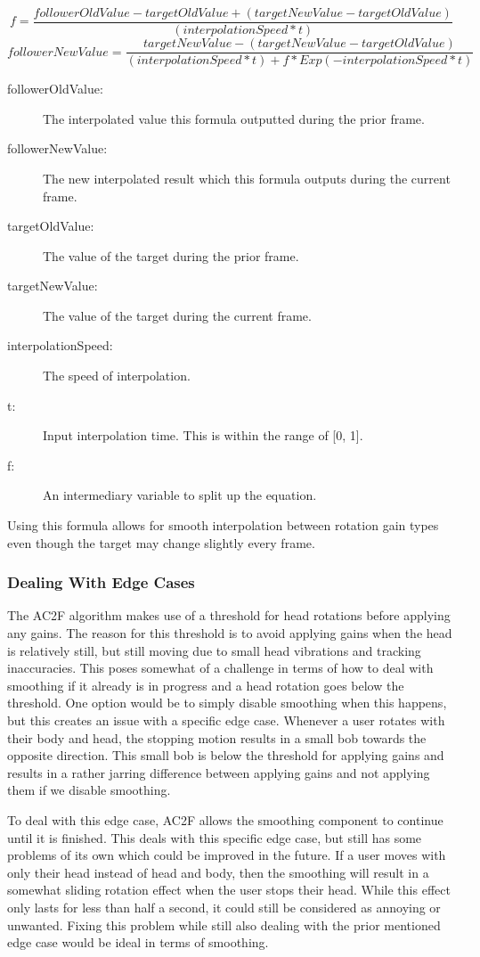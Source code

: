 $$
f = \frac{followerOldValue - targetOldValue + (targetNewValue - targetOldValue)}{(interpolationSpeed * t)}
$$
$$
followerNewValue = \frac{targetNewValue - (targetNewValue - targetOldValue)}{(interpolationSpeed * t) + f * Exp(-interpolationSpeed * t)}
$$
\begin{description}
    \item[followerOldValue:] The interpolated value this formula outputted during the prior frame.
    \item[followerNewValue:] The new interpolated result which this formula outputs during the current frame.
    \item[targetOldValue:] The value of the target during the prior frame. 
    \item[targetNewValue:] The value of the target during the current frame.
    \item[interpolationSpeed:] The speed of interpolation.
    \item[t:] Input interpolation time. This is within the range of [0, 1]. 
    \item[f:] An intermediary variable to split up the equation.
\end{description}

Using this formula allows for smooth interpolation between rotation gain types even though the target may change slightly every frame. 

\subsubsection{Dealing With Edge Cases}
The AC2F algorithm makes use of a threshold for head rotations before applying any gains. The reason for this threshold is to avoid applying gains when the head is relatively still, but still moving due to small head vibrations and tracking inaccuracies. This poses somewhat of a challenge in terms of how to deal with smoothing if it already is in progress and a head rotation goes below the threshold. One option would be to simply disable smoothing when this happens, but this creates an issue with a specific edge case. Whenever a user rotates with their body and head, the stopping motion results in a small bob towards the opposite direction. This small bob is below the threshold for applying gains and results in a rather jarring difference between applying gains and not applying them if we disable smoothing.

To deal with this edge case, AC2F allows the smoothing component to continue until it is finished. This deals with this specific edge case, but still has some problems of its own which could be improved in the future. If a user moves with only their head instead of head and body, then the smoothing will result in a somewhat sliding rotation effect when the user stops their head. While this effect only lasts for less than half a second, it could still be considered as annoying or unwanted. Fixing this problem while still also dealing with the prior mentioned edge case would be ideal in terms of smoothing. 


